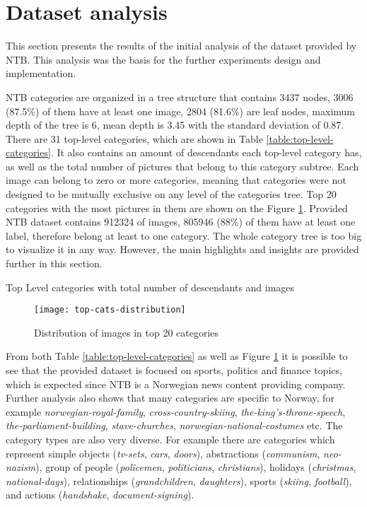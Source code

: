\section{Dataset analysis}
\label{sec:dataset-analysis}
This section presents the results of the initial analysis of the dataset provided by NTB. This analysis was the basis for the further experiments design and implementation.

NTB categories are organized in a tree structure that contains 3437 nodes, 3006 (87.5\%) of them have at least one image, 2804 (81.6\%) are leaf nodes, maximum depth of the tree is 6, mean depth is 3.45 with the standard deviation of 0.87. There are 31 top-level categories, which are shown in Table \ref{table:top-level-categories}. It also contains an amount of descendants each top-level category has, as well as the total number of pictures that belong to this category subtree. Each image can belong to zero or more categories, meaning that categories were not designed to be mutually exclusive on any level of the categories tree. Top 20 categories with the most pictures in them are shown on the Figure \ref{fig:top-cats-distribution}.  Provided NTB dataset contains 912324 of images, 805946 (88\%) of them have at least one label, therefore belong at least to one category. The whole category tree is too big to visualize it in any way. However, the main highlights and insights are provided further in this section.

\begin{table}[h!]
    \centering
    \caption{Top Level categories with total number of descendants and images}
    \label{table:top-level-categories}
\end{table}

\begin{figure}[h!]
    \centering
    \texttt{[image: top-cats-distribution]}
    \caption{Distribution of images in top 20 categories}
    \label{fig:top-cats-distribution}
\end{figure}

From both Table \ref{table:top-level-categories} as well as Figure \ref{fig:top-cats-distribution} it is possible to see that the provided dataset is focused on sports, politics and finance topics, which is expected since NTB is a Norwegian news content providing company. Further analysis also shows that many categories are specific to Norway, for example \textit{norwegian-royal-family}, \textit{cross-country-skiing}, \textit{the-king's-throne-speech}, \textit{the-parliament-building}, \textit{stave-churches}, \textit{norwegian-national-costumes} etc. The category types are also very diverse. For example there are categories which represent simple objects (\textit{tv-sets}, \textit{cars}, \textit{doors}), abstractions (\textit{communism}, \textit{neo-nazism}), group of people (\textit{policemen}, \textit{politicians}, \textit{christians}), holidays (\textit{christmas}, \textit{national-days}), relationships (\textit{grandchildren}, \textit{daughters}), sports (\textit{skiing}, \textit{football}), and actions (\textit{handshake}, \textit{document-signing}).

